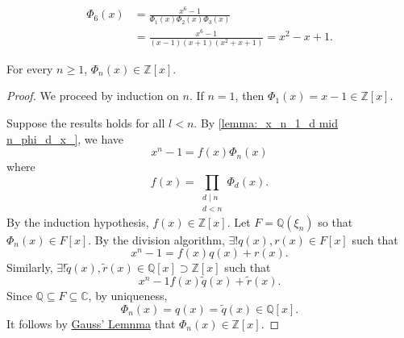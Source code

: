 \documentclass[notoc,notitlepage,nobib]{tufte-book}
\begin{document}
\begin{eg}
  \begin{align*}
    \Phi_6(x) &= \frac{x^6 - 1}{\Phi_1(x) \Phi_2(x) \Phi_3(x)} \\
              &= \frac{x^6 - 1}{(x - 1)(x + 1)(x^2 + x + 1)} = x^2 - x + 1.
  \end{align*}
\end{eg}

\begin{propo}\label{propo:cyclotomic_polynomials_have_integer_coefficients}
  For every $n \geq 1$, $\Phi_n(x) \in \mathbb{Z}[x]$.
\end{propo}

\begin{proof}
  We proceed by induction on $n$. If $n = 1$, then $\Phi_1(x) = x - 1 \in \mathbb{Z}[x]$.

  Suppose the results holds for all $l < n$. By \cref{lemma:_x_n_1_d mid n_phi_d_x_}, we
  have
  \begin{equation*}
    x^n - 1 = f(x) \Phi_n(x)
  \end{equation*}
  where
  \begin{equation*}
    f(x) = \prod_{\substack{d \mid n \\ d < n}} \Phi_d(x).
  \end{equation*}
  By the induction hypothesis, $f(x) \in \mathbb{Z}[x]$. Let $F = \mathbb{Q}(\xi_n)$ so
  that $\Phi_n(x) \in F[x]$. By the division algorithm, $\exists ! q(x), r(x) \in F[x]$
  such that
  \begin{equation*}
    x^n - 1 = f(x) q(x) + r(x).
  \end{equation*}
  Similarly, $\exists ! \tilde{q}(x), \tilde{r}(x) \in \mathbb{Q}[x] \supset
  \mathbb{Z}[x]$ such that
  \begin{equation*}
    x^n - 1 f(x) \tilde{q}(x) + \tilde{r}(x).
  \end{equation*}
  Since $\mathbb{Q} \subseteq F \subseteq \mathbb{C}$, by uniqueness,
  \begin{equation*}
    \Phi_n(x) = q(x) = \tilde{q}(x) \in \mathbb{Q}[x].
  \end{equation*}
  It follows by \hyperref[thm:gauss_lemma]{Gauss' Lemnma} that $\Phi_n(x) \in
  \mathbb{Z}[x]$.
\end{proof}
\end{document}
